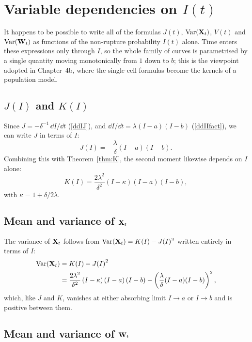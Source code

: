 \section{Variable dependencies on $I(t)$}
\label{sec:dependencies}

It happens to be possible to write all of the formulas $J(t)$,
$\text{Var}({{\bf X}_t})$, $V(t)$ and $\text{Var}({{\bf W}_t})$ as functions of the
non-rupture probability $I(t)$ alone. Time enters these expressions only
through $I$, so the whole family of curves is parametrised by a single
quantity moving monotonically from $1$ down to $b$; this is the viewpoint
adopted in Chapter~4b, where the single-cell formulas become the kernels of a
population model.

\subsection{$J(I)$ and $K(I)$}

Since $J = -\delta^{-1}\,{\dd I}/{\dd t}$ (\ref{ddIJ}), and
${\dd I}/{\dd t} = \lambda (I - a)(I-b)$ (\ref{ddIIfact}), we can write $J$
in terms of $I$:
\begin{equation}
\label{JI}
J(I) = -\frac{\lambda}{\delta} (I - a)(I-b).
\end{equation}
Combining this with Theorem~\ref{thm:K}, the second moment likewise depends on
$I$ alone:
\begin{equation}
\label{KI}
K(I) = \frac{2\lambda^2}{\delta^2}(I-\kappa)(I - a)(I-b),
\end{equation}
with $\kappa = 1+\delta/2\lambda$.

\subsection{Mean and variance of ${{\bf X}_t}$}

The variance of ${{\bf X}_t}$ follows from $\text{Var}({{\bf X}_t}) = K(I) - J(I)^2$ written
entirely in terms of $I$:
\begin{align*}
\text{Var}({{\bf X}_t}) &= K(I) - {J(I)}^2\\
&=\frac{2\lambda^2}{\delta^2}\left( I-\kappa\right)\left( I-a\right)\left( I-b\right)
- \left(\frac{\lambda}{\delta}(I - a)(I-b)\right)^2,
\end{align*}
which, like $J$ and $K$, vanishes at either absorbing limit $I\to a$ or
$I\to b$ and is positive between them.

\subsection{Mean and variance of ${{\bf W}_t}$}

